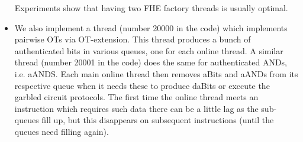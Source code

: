 \begin{itemize}
Experiments show that having two FHE factory threads is usually
optimal.
\item We also implement a thread (number 20000 in the code)
which implements pairwise OTs via OT-extension.
This thread produces a bunch of authenticated bits in various
queues, one for each online thread.
A similar thread (number 20001 in the code) does the
same for authenticated ANDs, i.e. aANDS.
Each main online thread then removes aBits and aANDs 
from its respective queue when it needs these to produce  
daBits or execute the garbled circuit protocols.
The first time the online thread meets an instruction which
requires such data there can be a little lag as the sub-queues
fill up, but this disappears on subsequent instructions
(until the queues need filling again).
\end{itemize}


